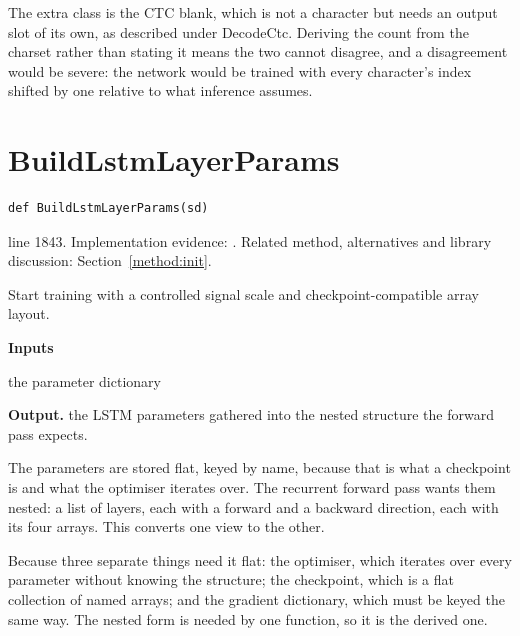 The extra class is the CTC blank, which is not a character but needs an output slot of its own, as described under DecodeCtc. Deriving the count from the charset rather than stating it means the two cannot disagree, and a disagreement would be severe: the network would be trained with every character's index shifted by one relative to what inference assumes.



\section{BuildLstmLayerParams}\label{fn:train:BuildLstmLayerParams}
\begin{lstlisting}[style=sig]
def BuildLstmLayerParams(sd)
\end{lstlisting}
 line 1843. Implementation evidence: \cite{code2026}. Related method, alternatives and library discussion: Section~\ref{method:init}.


Start training with a controlled signal scale and checkpoint-compatible array layout.




\noindent\textbf{Inputs}
\begin{description}[leftmargin=2.2em,style=nextline,font=\normalfont\ttfamily]\setlength\itemsep{1pt}
  \item[{sd}] \normalfont the parameter dictionary
\end{description}

\noindent\textbf{Output.} the LSTM parameters gathered into the nested structure the forward pass expects.


The parameters are stored flat, keyed by name, because that is what a checkpoint is and what the optimiser iterates over. The recurrent forward pass wants them nested: a list of layers, each with a forward and a backward direction, each with its four arrays. This converts one view to the other.


Because three separate things need it flat: the optimiser, which iterates over every parameter without knowing the structure; the checkpoint, which is a flat collection of named arrays; and the gradient dictionary, which must be keyed the same way. The nested form is needed by one function, so it is the derived one.


